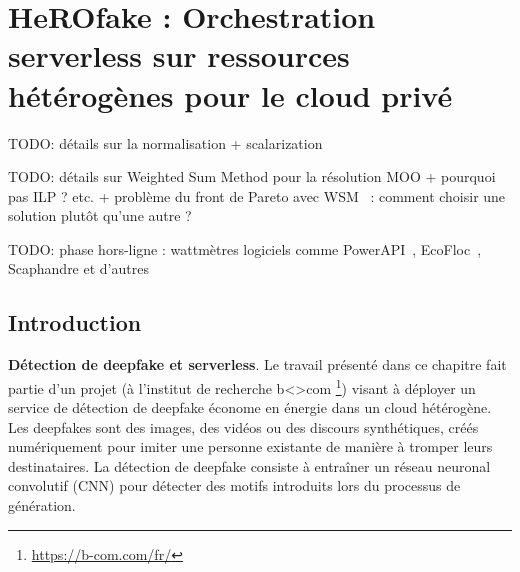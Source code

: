 \chapter{HeROfake : Orchestration serverless sur ressources hétérogènes pour le cloud privé}
\label{chapter:herofake}

TODO: détails sur la normalisation + scalarization~\cite{ehrgottMulticriteriaOptimization882005}

TODO: détails sur Weighted Sum Method pour la résolution MOO + pourquoi pas ILP ? etc. + problème du front de Pareto avec WSM~\cite{marlerWeightedSumMethod2010} : comment choisir une solution plutôt qu'une autre ?

TODO: phase hors-ligne : wattmètres logiciels comme PowerAPI~\cite{fieniPowerAPIPythonFramework2024}, EcoFloc~\cite{valeraEnergySavingPerspective}, Scaphandre et d'autres~\cite{jayExperimentalComparisonSoftwarebased2023}




\section{Introduction}
\label{section:herofake-introduction}

\textbf{Détection de deepfake et serverless}. Le travail présenté dans ce chapitre fait partie d'un projet (à l'institut de recherche b{\textless\textgreater}com \footnote{\href{https://b-com.com/fr/}{https://b-com.com/fr/}}) visant à déployer un service de détection de deepfake économe en énergie dans un cloud hétérogène. Les deepfakes sont des images, des vidéos ou des discours synthétiques, créés numériquement pour imiter une personne existante de manière à tromper leurs destinataires. La détection de deepfake consiste à entraîner un réseau neuronal convolutif (CNN) pour détecter des motifs introduits lors du processus de génération.

